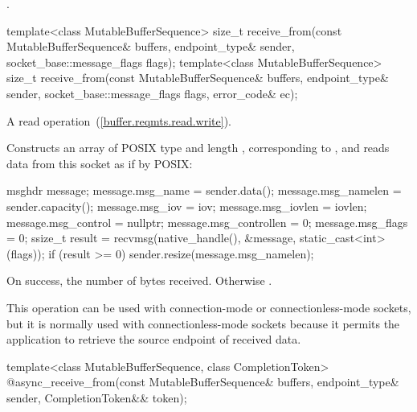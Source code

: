 \begin{itemdescr}
\pnum
\returns {}.
\end{itemdescr}

\begin{itemdecl}
template<class MutableBufferSequence>
  size_t receive_from(const MutableBufferSequence& buffers,
                      endpoint_type& sender,
                      socket_base::message_flags flags);
template<class MutableBufferSequence>
  size_t receive_from(const MutableBufferSequence& buffers,
                      endpoint_type& sender,
                      socket_base::message_flags flags,
                      error_code& ec);
\end{itemdecl}

\begin{itemdescr}
\pnum
A read operation~(\ref{buffer.reqmts.read.write}).

\pnum
\effects Constructs an array  of POSIX type  and length , corresponding to , and reads data from this socket as if by POSIX:
\begin{codeblock}
msghdr message;
message.msg_name = sender.data();
message.msg_namelen = sender.capacity();
message.msg_iov = iov;
message.msg_iovlen = iovlen;
message.msg_control = nullptr;
message.msg_controllen = 0;
message.msg_flags = 0;
ssize_t result = recvmsg(native_handle(), &message, static_cast<int>(flags));
if (result >= 0)
  sender.resize(message.msg_namelen);
\end{codeblock}


\pnum
\returns On success, the number of bytes received. Otherwise .

\pnum
 \begin{note} This operation can be used with connection-mode or connectionless-mode sockets, but it is normally used with connectionless-mode sockets because it permits the application to retrieve the source endpoint of received data. \end{note}
\end{itemdescr}

\begin{itemdecl}
template<class MutableBufferSequence, class CompletionToken>
  @\DEDUCED@ async_receive_from(const MutableBufferSequence& buffers,
                             endpoint_type& sender,
                             CompletionToken&& token);
\end{itemdecl}

